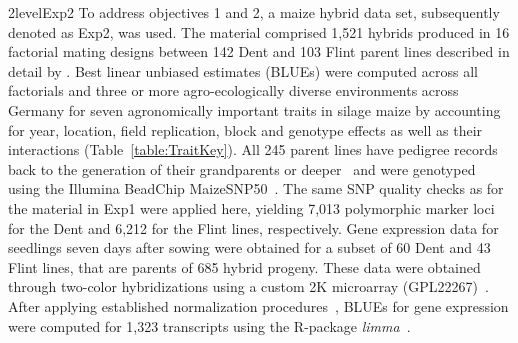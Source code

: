\documentclass[12pt,titlepage]{article}
\begin{document}
\Genetics2level{Exp2}
To address objectives 1 and 2, a maize hybrid data set, subsequently
denoted as Exp2, was used.
The material comprised 1,521 hybrids produced in 16 factorial mating designs
between 142 Dent and 103 Flint parent lines described in detail by
.
Best linear unbiased estimates (BLUEs) were computed across all factorials and 
three or more agro-ecologically diverse environments across Germany for seven
agronomically important traits in silage maize by accounting for year, location,
field replication, block and genotype effects as well as their interactions
(Table~\ref{table:TraitKey}).
All 245 parent lines have pedigree records back to the generation of their 
grandparents or deeper~\cite{Westhues2017} and were genotyped using the Illumina 
BeadChip MaizeSNP50~\cite{Ganal2011}.
The same SNP quality checks as for the material in Exp1 were applied here,
yielding 7,013 polymorphic marker loci for the Dent and 6,212 for the Flint
lines, respectively.
Gene expression data for seedlings seven days after sowing were obtained for a 
subset of 60 Dent and 43 Flint lines, that are parents of 685 hybrid progeny.
These data were obtained through two-color hybridizations using a custom 2K 
microarray (GPL22267)~\cite{Westhues2017}.
After applying established normalization procedures~\cite{Smyth2003,Ritchie2007},
BLUEs for gene expression were computed for 1,323 transcripts
\cite{Westhues2017} using the R-package \emph{limma}~\cite{Ritchie2015a}.
\end{document}
